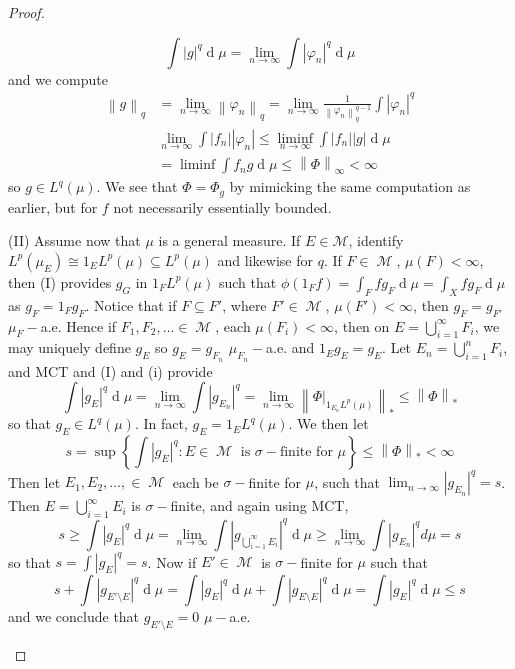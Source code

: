 \documentclass[12pt, a4paper]{memoir}
\newcommand{\norm}[1]{\ensuremath{\left\lVert#1\right\rVert}} %
\theoremstyle{nonumberplain}
\newtheorem{proof}{Proof}
\DeclareMathOperator{\M}{\mathcal{M}}
\renewcommand{\d}[1]{\ensuremath{\operatorname{d}\!{#1}}} %
\begin{document}
\begin{proof}
\begin{enumerate}[label=(\roman*)]
\begin{equation*}
                \int|g|^q\d{\mu}=\lim_{n\to\infty}\int|\varphi_n|^q\d{\mu}
            \end{equation*}
            and we compute
            \begin{align*}
                \norm{g}_q&=\lim_{n\to\infty}\norm{\varphi_n}_q=\lim_{n\to\infty}\frac{1}{\norm{\varphi_n}_q^{q-1}}\int|\varphi_n|^q\\
                          &\lim_{n\to\infty}\int|f_n||\varphi_n|\leq\liminf_{n\to\infty}\int|f_n||g|\d{\mu}\\
                          &= \liminf\int f_ng\d{\mu}\leq\norm{\Phi}_\infty<\infty
            \end{align*}
            so $g\in L^q(\mu)$.
            We see that $\Phi=\Phi_g$ by mimicking the same computation as earlier, but for $f$ not necessarily essentially bounded.

            (II) Assume now that $\mu$ is a general measure.
            If $E\in\mathcal{M}$, identify $L^p(\mu_E)\cong 1_EL^p(\mu)\subseteq L^p(\mu)$ and likewise for $q$.
            If $F\in\M$, $\mu(F)<\infty$, then (I) provides $g_G$ in $1_FL^p(\mu)$ such that $\phi(1_Ff)=\int_F fg_F\d{\mu}=\int_X fg_F\d{\mu}$ as $g_F=1_Fg_F$.
            Notice that if $F\subseteq F'$, where $F'\in\M$, $\mu(F')<\infty$, then $g_F=g_{F'}$ $\mu_F-$a.e.
            Hence if $F_1,F_2,\ldots\in\M$, each $\mu(F_i)<\infty$, then on $E=\bigcup_{i=1}^\infty F_i$, we may uniquely define $g_E$ so $g_E=g_{F_n}$ $\mu_{F_n}-$a.e. and $1_Eg_E=g_E$.
            Let $E_n=\bigcup_{i=1}^n F_i$, and MCT and (I) and (i) provide
            \begin{equation*}
                \int|g_E|^q\d{\mu}=\lim_{n\to\infty}\int|g_{E_n}|^q=\lim_{n\to\infty}\norm{\Phi|_{1_{E_n}L^p(\mu)}}_*\leq\norm{\Phi}_*
            \end{equation*}
            so that $g_E\in L^q(\mu)$.
            In fact, $g_E=1_EL^q(\mu)$.
            We then let
            \begin{equation*}
                s=\sup\left\{\int|g_E|^q:E\in\M\text{ is $\sigma-$finite for $\mu$}\right\}\leq\norm{\Phi}_*<\infty
            \end{equation*}
            Then let $E_1,E_2,\ldots,\in\M$ each be $\sigma-$finite for $\mu$, such that $\lim_{n\to\infty}|g_{E_n}|^q=s$.
            Then $E=\bigcup_{i=1}^\infty E_i$ is $\sigma-$finite, and again using MCT,
            \begin{equation*}
                s\geq\int|g_E|^q\d{\mu}=\lim_{n\to\infty}\int|g_{\bigcup_{i=1}^\infty E_i}|^q\d{\mu}\geq\lim_{n\to\infty}\int|g_{E_n}|^qd{\mu}=s
            \end{equation*}
            so that $s=\int|g_E|^q=s$.
            Now if $E'\in\M$ is $\sigma-$finite for $\mu$ such that
            \begin{equation*}
                s+\int|g_{E'\setminus E}|^q\d{\mu}=\int|g_E|^q\d{\mu}+\int|g_{E\setminus E}|^q\d{\mu}=\int|g_E|^q\d{\mu}\leq s
            \end{equation*}
            and we conclude that $g_{E'\setminus E}=0$ $\mu-$a.e.


\end{enumerate}
\end{proof}
\end{document}
